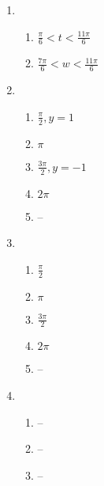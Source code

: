 \documentclass{article}
\begin{document}
\begin{enumerate}
\begin{enumerate}
	\end{enumerate}
	
\item

	\begin{enumerate}
	
	\item $\frac{\pi}{6} < t < \frac{11 \pi}{6}$
	
	\item $\frac{7 \pi}{6} < w < \frac{11 \pi}{6}$
	
	\end{enumerate}
	
\item

	\begin{enumerate}
	
	\item $\frac{\pi}{2}, y = 1$
	
	\item $\pi$
	
	\item $\frac{3\pi}{2}, y = -1$
	
	\item $2\pi$
	
	\item --
	
	\end{enumerate}
	
\item

	\begin{enumerate}
	
	\item $\frac{\pi}{2}$
	
	\item $\pi$
	
	\item $\frac{3\pi}{2}$
	
	\item $2\pi$
	
	\item --
	
	\end{enumerate}
	
\item

	\begin{enumerate}
	
	\item --
	
	\item --
	
	\item --
	

\end{enumerate}
\end{enumerate}
\end{document}
